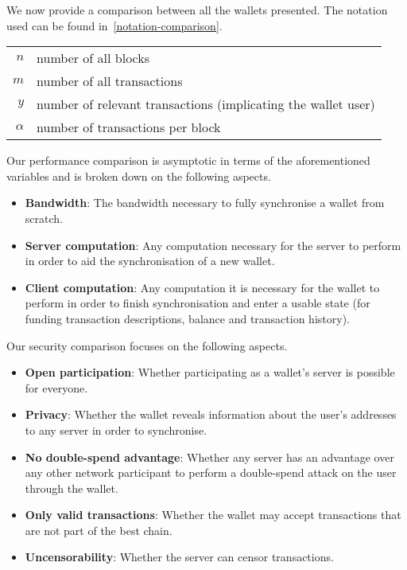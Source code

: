 We now provide a comparison between all the wallets presented. The notation used can be found in~\cref{notation-comparison}.

\begin{table*}
    \caption{The notation used throughout our comparison.\label{notation-comparison}}
    \centering
    \begin{tabular}{r|l}
    $n$ & number of all blocks \\
    $m$ & number of all transactions \\
    $y$ & number of relevant transactions (implicating the wallet user) \\
    $\alpha$ & number of transactions per block \\
    \end{tabular}
\end{table*}

Our performance comparison is asymptotic in terms of the aforementioned variables and is broken down on the following aspects.

\begin{itemize}
    \item \textbf{Bandwidth}: The bandwidth necessary to fully synchronise a wallet from scratch.
    \item \textbf{Server computation}: Any computation necessary for the server to perform in order to aid the synchronisation of a new wallet.
    \item \textbf{Client computation}: Any computation it is necessary for the wallet to perform in order to finish synchronisation and enter a usable state (for funding transaction descriptions, balance and transaction history).
\end{itemize}

Our security comparison focuses on the following aspects.
\begin{itemize}
    \item \textbf{Open participation}: Whether participating as a wallet's server is possible for everyone.
    \item \textbf{Privacy}: Whether the wallet reveals information about the user's addresses to any server in order to synchronise.
    \item \textbf{No double-spend advantage}: Whether any server has an advantage over any other network participant to perform a double-spend attack on the user through the wallet.
    \item \textbf{Only valid transactions}: Whether the wallet may accept transactions that are not part of the best chain.
    \item \textbf{Uncensorability}: Whether the server can censor transactions.
\end{itemize}

